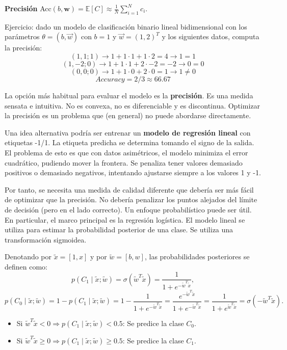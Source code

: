 \textbf{Precisión} Acc$(b, \mathbf{w}) = \mathbb{E}[C] \approx \frac{1}{N} \sum_{i=1}^{N} c_i$.

Ejercicio: dado un modelo de clasificación binario lineal bidimensional con los parámetros $\theta = (b, \vec{w})$ con $b=1$ y $\vec{w} = (1,2)^T$ y los siguientes datos, computa la precisión:
$$(1,1; 1) \rightarrow 1 + 1 \cdot 1 + 1 \cdot 2 = 4 \rightarrow 1 = 1$$
$$(1,-2; 0) \rightarrow 1 + 1 \cdot 1 + 2 \cdot -2 = -2 \rightarrow 0 = 0$$
$$(0,0; 0) \rightarrow 1 + 1 \cdot 0 + 2 \cdot 0 = 1 \rightarrow 1 \neq 0$$
$$Accuracy = 2/3 \approx 66.67$$

La opción más habitual para evaluar el modelo es la \textbf{precisión}. Es una medida sensata e intuitiva. No es convexa, no es diferenciable y es discontinua.
Optimizar la precisión es un problema que (en general) no puede abordarse directamente. 

Una idea alternativa podría ser entrenar un \textbf{modelo de regresión lineal} con etiquetas -1/1. La etiqueta predicha se determina tomando el signo de la salida. El problema de esto es que con datos asimétricos, el modelo minimiza el error cuadrático, pudiendo mover la frontera. Se penaliza tener valores demasiado positivos o demasiado negativos, intentando ajustarse siempre a los valores 1 y -1. 

Por tanto, se necesita una medida de calidad diferente que debería ser más fácil de optimizar que la precisión. No debería penalizar los puntos alejados del límite de decisión (pero en el lado correcto). Un enfoque probabilístico puede ser útil. En particular, el marco principal es la regresión logística. El modelo lineal se utiliza para estimar la probabilidad posterior de una clase. Se utiliza una transformación sigmoidea.

Denotando por $\tilde{x} = [1, x]$ y por $\tilde{w} = [b, w]$, las probabilidades posteriores se definen como:
$$
p(C_1 \mid \tilde{x}; \tilde{w}) = \sigma(\tilde{w}^T \tilde{x}) = \frac{1}{1 + e^{-\tilde{w}^T \tilde{x}}},
$$
$$
p(C_0 \mid \tilde{x}; \tilde{w}) = 1 - p(C_1 \mid \tilde{x}; \tilde{w}) = 1 - \frac{1}{1 + e^{-\tilde{w}^T \tilde{x}}} = \frac{e^{-\tilde{w}^T \tilde{x}}}{1 + e^{-\tilde{w}^T \tilde{x}}} = \frac{1}{1 + e^{\tilde{w}^T \tilde{x}}} = \sigma(-\tilde{w}^T \tilde{x}).
$$

\begin{itemize}
    \item Si $\tilde{w}^T \tilde{x} < 0 \Rightarrow p(C_1 \mid \tilde{x}; \tilde{w}) < 0.5$: Se predice la clase $C_0$.
    \item Si $\tilde{w}^T \tilde{x} \geq 0 \Rightarrow p(C_1 \mid \tilde{x}; \tilde{w}) \geq 0.5$: Se predice la clase $C_1$.
\end{itemize}  

